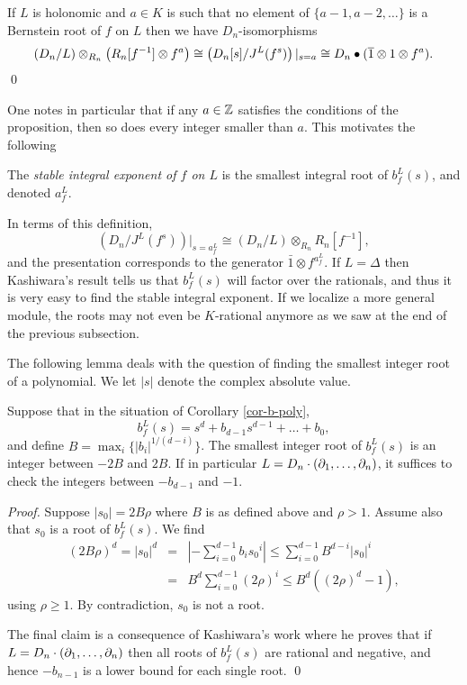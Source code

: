 \begin{proposition}
If $L$ is holonomic and $a\in K$ is such that 
no element of $\{a-1,a-2,\ldots\}$ is a Bernstein
root of $f$ on $L$ then we have $D_n$-isomorphisms 
\begin{equation}
(D_n/L)\otimes_{R_n}\left( R_n[f^{-1}]\otimes f^a\right)
\cong \left(D_n[s]/J^L(f^s)\right)|_{s=a}\cong D_n\bullet
(\overline{1} \otimes 1\otimes f^a).
\end{equation}
\qed
\end{proposition}
One notes in particular that
if any $a\in{\mathbb Z} $ satisfies the conditions of the
proposition, then so does every integer smaller than $a$. This
motivates the following 
\begin{definition}
The {\em stable integral exponent of $f$ on $L$} is the smallest
integral root of $b^L_f(s)$, and denoted $a^L_f$.
\end{definition}
In terms of this definition, 
\[
\left(D_n/J^L(f^s)\right)|_{s=a^L_f}\cong
(D_n/L)\otimes_{R_n}R_n[f^{-1}],
\]
and the presentation corresponds to the generator $\bar 1\otimes
f^{a^L_f}$. 
If $L=\Delta$ then Kashiwara's result tells us that $b^L_f(s)$ will
factor over the rationals, and thus it is very easy to find the stable
integral exponent. If we localize a more general module, 
the roots  may not even be
$K$-rational anymore as we saw at the end of the previous subsection. 

The following lemma deals with the question of finding the smallest
integer root of a polynomial. We let $|s|$ denote the complex absolute
value. 
\begin{lemma}
Suppose that in the situation of Corollary \ref{cor-b-poly}, 
\[
b^L_f(s)=s^d+b_{d-1}s^{d-1}+\dots+b_0,
\]
and define 
$B=\max_{i}\{|b_i|^{1/(d-i)}\}$.
The smallest integer root of $b^L_f(s)$ is an integer between $-2B$
and $2B$. 
If in particular $L=D_n\cdot 
(\partial_1,\ldots,\partial_n)$, it suffices to check the
integers between $-b_{d-1}$ and $-1$.
\end{lemma}

\begin{proof}
Suppose
$|s_0|=2B\rho$ where $B$ is as defined above and $\rho>1$. 
Assume 
also that $s_0$ is a root of $b_f^L(s)$. We find
\begin{eqnarray*}
(2B\rho)^d=|s_0|^d&=&|-\sum_{i=0}^{d-1}b_i{s_0}^i|
\le\sum_{i=0}^{d-1}B^{d-i}|s_0|^i\\
&=&B^d\sum_{i=0}^{d-1}(2\rho)^i
\le B^d((2\rho)^d-1),
\end{eqnarray*}
using $\rho\geq 1$.
By contradiction, $s_0$ is not a root.

The
final claim is a consequence of Kashiwara's work
 \cite{DM:K} where
he proves that if $L=D_n\cdot(\partial_1,\ldots,\partial_n)$ then  all roots of
$b_f^L(s)$ are rational and negative, and hence 
$-b_{n-1}$ is a 
lower bound for each single root.
\qed
\end{proof}

